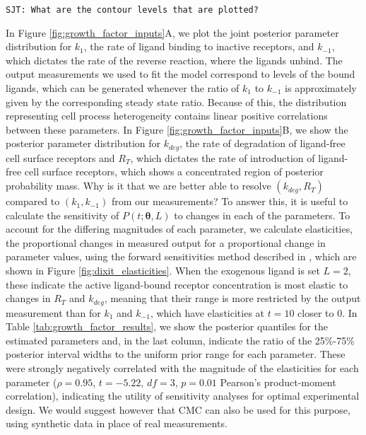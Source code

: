 \centerline{\tt SJT: What are the contour levels that are plotted?}

In Figure \ref{fig:growth_factor_inputs}A, we plot the joint posterior parameter distribution for $k_1$, the rate of ligand binding to inactive receptors, and $k_{-1}$, which dictates the rate of the reverse reaction, where the ligands unbind. The output measurements we used to fit the model correspond to levels of the bound ligands, which can be generated whenever the ratio of $k_1$ to $k_{-1}$ is approximately given by the corresponding steady state ratio. Because of this, the distribution representing cell process heterogeneity contains linear positive correlations between these parameters. In Figure \ref{fig:growth_factor_inputs}B, we show the posterior parameter distribution for $k_{deg}$, the rate of degradation of ligand-free cell surface receptors and $R_T$, which dictates the rate of introduction of ligand-free cell surface receptors, which shows a concentrated region of posterior probability mass. Why is it that we are better able to resolve $(k_{deg},R_T)$ compared to $(k_1,k_{-1})$ from our measurements? To answer this, it is useful to calculate the sensitivity of $P(t; \boldsymbol{\theta}, L)$ to changes in each of the parameters. To account for the differing magnitudes of each parameter, we calculate elasticities, the proportional changes in measured output for a proportional change in parameter values, using the forward sensitivities method described in \cite{DGCT2018}, which are shown in Figure \ref{fig:dixit_elasticities}. When the exogenous ligand is set $L=2$, these indicate the active ligand-bound receptor concentration is most elastic to changes in $R_T$ and $k_{deg}$, meaning that their range is more restricted by the output measurement than for $k_1$ and $k_{-1}$, which have elasticities at $t=10$ closer to 0. In Table \ref{tab:growth_factor_results}, we show the posterior quantiles for the estimated parameters and, in the last column, indicate the ratio of the 25\%-75\% posterior interval widths to the uniform prior range for each parameter. These were strongly negatively correlated with the magnitude of the elasticities for each parameter ($\rho=0.95$, $t=-5.22$, $df=3$, $p=0.01$ Pearson's product-moment correlation), indicating the utility of sensitivity analyses for optimal experimental design. We would suggest however that CMC can also be used for this purpose, using synthetic data in place of real measurements.



